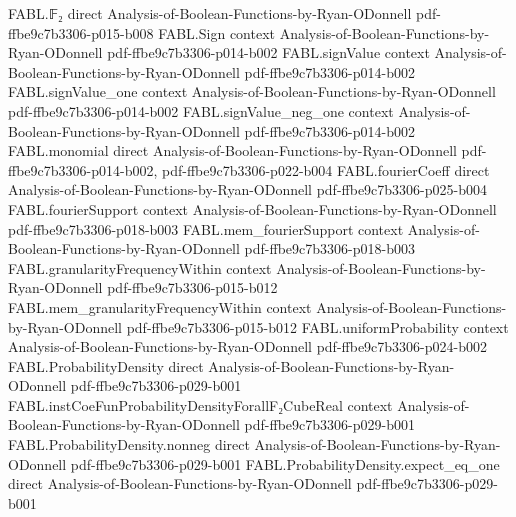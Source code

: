 \begin{theorem}
\label{FABL.convolution_probability_eq_add}
\leanok
{}
\proofstep
  {FABL.𝔽₂}
  {direct}
  {Analysis-of-Boolean-Functions-by-Ryan-ODonnell}
  {pdf-ffbe9c7b3306-p015-b008}
\proofstep
  {FABL.Sign}
  {context}
  {Analysis-of-Boolean-Functions-by-Ryan-ODonnell}
  {pdf-ffbe9c7b3306-p014-b002}
\proofstep
  {FABL.signValue}
  {context}
  {Analysis-of-Boolean-Functions-by-Ryan-ODonnell}
  {pdf-ffbe9c7b3306-p014-b002}
\proofstep
  {FABL.signValue_one}
  {context}
  {Analysis-of-Boolean-Functions-by-Ryan-ODonnell}
  {pdf-ffbe9c7b3306-p014-b002}
\proofstep
  {FABL.signValue_neg_one}
  {context}
  {Analysis-of-Boolean-Functions-by-Ryan-ODonnell}
  {pdf-ffbe9c7b3306-p014-b002}
\proofstep
  {FABL.monomial}
  {direct}
  {Analysis-of-Boolean-Functions-by-Ryan-ODonnell}
  {pdf-ffbe9c7b3306-p014-b002,
    pdf-ffbe9c7b3306-p022-b004}
\proofstep
  {FABL.fourierCoeff}
  {direct}
  {Analysis-of-Boolean-Functions-by-Ryan-ODonnell}
  {pdf-ffbe9c7b3306-p025-b004}
\proofstep
  {FABL.fourierSupport}
  {context}
  {Analysis-of-Boolean-Functions-by-Ryan-ODonnell}
  {pdf-ffbe9c7b3306-p018-b003}
\proofstep
  {FABL.mem_fourierSupport}
  {context}
  {Analysis-of-Boolean-Functions-by-Ryan-ODonnell}
  {pdf-ffbe9c7b3306-p018-b003}
\proofstep
  {FABL.granularityFrequencyWithin}
  {context}
  {Analysis-of-Boolean-Functions-by-Ryan-ODonnell}
  {pdf-ffbe9c7b3306-p015-b012}
\proofstep
  {FABL.mem_granularityFrequencyWithin}
  {context}
  {Analysis-of-Boolean-Functions-by-Ryan-ODonnell}
  {pdf-ffbe9c7b3306-p015-b012}
\proofstep
  {FABL.uniformProbability}
  {context}
  {Analysis-of-Boolean-Functions-by-Ryan-ODonnell}
  {pdf-ffbe9c7b3306-p024-b002}
\proofstep
  {FABL.ProbabilityDensity}
  {direct}
  {Analysis-of-Boolean-Functions-by-Ryan-ODonnell}
  {pdf-ffbe9c7b3306-p029-b001}
\proofstep
  {FABL.instCoeFunProbabilityDensityForallF₂CubeReal}
  {context}
  {Analysis-of-Boolean-Functions-by-Ryan-ODonnell}
  {pdf-ffbe9c7b3306-p029-b001}
\proofstep
  {FABL.ProbabilityDensity.nonneg}
  {direct}
  {Analysis-of-Boolean-Functions-by-Ryan-ODonnell}
  {pdf-ffbe9c7b3306-p029-b001}
\proofstep
  {FABL.ProbabilityDensity.expect_eq_one}
  {direct}
  {Analysis-of-Boolean-Functions-by-Ryan-ODonnell}
  {pdf-ffbe9c7b3306-p029-b001}

\end{theorem}
